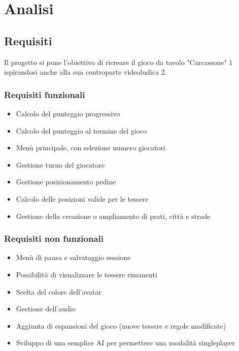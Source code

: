 \section{Analisi}
\subsection{Requisiti}
Il progetto si pone l'obiettivo di ricreare il gioco da tavolo "Carcassone" 1 ispirandosi anche alla sua controparte videoludica 2. 

\subsubsection*{Requisiti funzionali}
\begin{itemize}
\item Calcolo del punteggio progressivo
\item Calcolo del punteggio al termine del gioco
\item Menù principale, con selezione numero giocatori
\item Gestione turno del giocatore
\item Gestione posizionamento pedine
\item Calcolo delle posizioni valide per le tessere
\item Gestione della creazione o ampliamento di prati, città e strade
\end{itemize}

\subsubsection*{Requisiti non funzionali}
\begin{itemize}
\item Menù di pausa e salvataggio sessione
\item Possibilità di visualizzare le tessere rimanenti
\item Scelta del colore dell’avatar
\item Gestione dell’audio
\item Aggiunta di espansioni del gioco (nuove tessere e regole modificate)
\item Sviluppo di una semplice AI per permettere una modalità singleplayer
\end{itemize}

